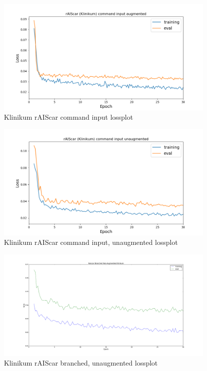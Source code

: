 \documentclass[a4paper]{article}
\begin{document}
\begin{figure}[!htbp]
  \centering
  \includegraphics[width=0.95\textwidth]{figures/klinikum_command_input_aug_lossplot}
  \caption{Klinikum rAIScar command input lossplot}
  \label{fig:klinikum_augmented_command_loss}
\end{figure}
\begin{figure}[!htbp]
  \centering
  \includegraphics[width=0.95\textwidth]{figures/klinikum_command_input_nonaug_lossplot}
  \caption{Klinikum rAIScar command input, unaugmented lossplot}
  \label{fig:klinikum_unaugmented_command_loss}
\end{figure}
\begin{figure}[H]
\centering
\includegraphics[width=0.95\textwidth]{figures/raiscar_branched_non_aug_klinikum_lossplot}
\caption{Klinikum rAIScar branched, unaugmented lossplot}
\label{fig:klinikum_unaugmented_branched_loss}
\end{figure}
\end{document}
